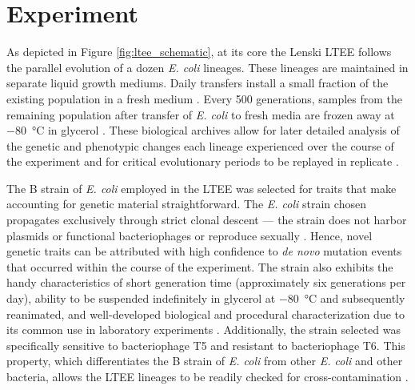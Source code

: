 \section{Experiment}



As depicted in Figure \ref{fig:ltee_schematic}, at its core the Lenski LTEE follows the parallel evolution of a dozen \textit{E. coli} lineages.
These lineages are maintained in separate liquid growth mediums. 
Daily transfers install a small fraction of the existing population in a fresh medium \cite{Blount2016AContingency}.
Every 500 generations, samples from the remaining population after transfer of \textit{E. coli} to fresh media are frozen away at \SI{-80}{\celsius} in glycerol \cite{Lenski2017TheSite}.
These biological archives allow for later detailed analysis of the genetic and phenotypic changes each lineage experienced over the course of the experiment \cite{Blount2012GenomicPopulation} and for critical evolutionary periods to be replayed in replicate \cite{Turner2015ReplayingPopulation}.

The B strain of \textit{E. coli} employed in the LTEE was selected for traits that make accounting for genetic material straightforward. 
The \textit{E. coli} strain chosen propagates exclusively through strict clonal descent --- the strain does not harbor plasmids or functional bacteriophages or reproduce sexually \cite{Lenski1991Long-TermGenerations}.
Hence, novel genetic traits can be attributed with high confidence to \textit{de novo} mutation events that occurred within the course of the experiment.
The strain also exhibits the handy characteristics of short generation time (approximately six generations per day), ability to be suspended indefinitely in glycerol at \SI{-80}{\celsius} and subsequently reanimated, and well-developed biological and procedural characterization due to its common use in laboratory experiments \cite{Lenski2017TheSite,Lenski1991Long-TermGenerations}.
Additionally, the strain selected was specifically sensitive to bacteriophage T5 and resistant to bacteriophage T6.
This property, which differentiates the B strain of \textit{E. coli} from other \textit{E. coli} and other bacteria, allows the LTEE lineages to be readily checked for cross-contamination \cite{Lenski2017TheSite}.

